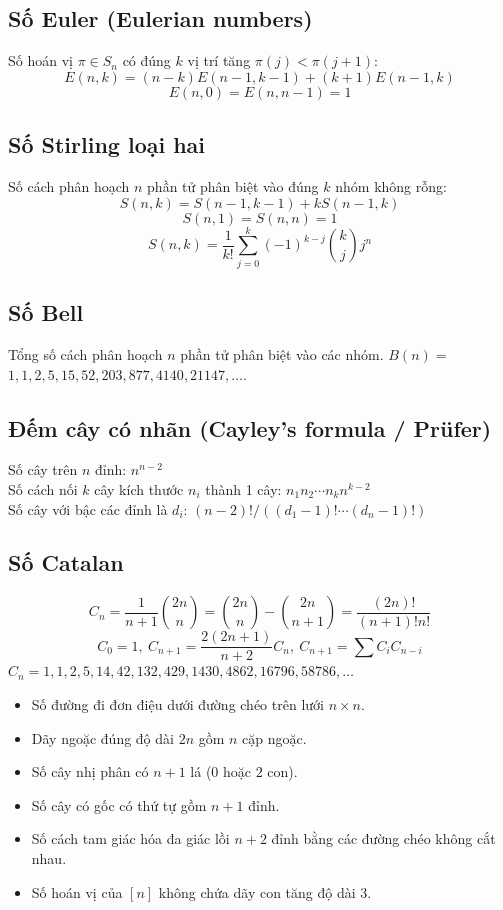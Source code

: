 	\subsection{Số Euler (Eulerian numbers)}
		Số hoán vị $\pi \in S_n$ có đúng $k$ vị trí tăng $\pi(j) < \pi(j+1)$:
		$$E(n,k) = (n-k)E(n-1,k-1) + (k+1)E(n-1,k)$$
		$$E(n,0) = E(n,n-1) = 1$$

	\subsection{Số Stirling loại hai}
		Số cách phân hoạch $n$ phần tử phân biệt vào đúng $k$ nhóm không rỗng:
		$$S(n,k) = S(n-1,k-1) + k S(n-1,k)$$
		$$S(n,1) = S(n,n) = 1$$
		$$S(n,k) = \frac{1}{k!}\sum_{j=0}^k (-1)^{k-j}\binom{k}{j}j^n$$

	\subsection{Số Bell}
		Tổng số cách phân hoạch $n$ phần tử phân biệt vào các nhóm. $B(n) =$
		$1, 1, 2, 5, 15, 52, 203, 877, 4140, 21147, \dots$.

	\subsection{Đếm cây có nhãn (Cayley's formula / Prüfer)}
		Số cây trên $n$ đỉnh: $n^{n-2}$ \\
		Số cách nối $k$ cây kích thước $n_i$ thành 1 cây: $n_1n_2\cdots n_k n^{k-2}$ \\
		Số cây với bậc các đỉnh là $d_i$: $(n-2)! / ((d_1-1)! \cdots (d_n-1)!)$

	\subsection{Số Catalan}
		\[ C_n=\frac{1}{n+1}\binom{2n}{n}= \binom{2n}{n}-\binom{2n}{n+1} = \frac{(2n)!}{(n+1)!n!} \]
		\[ C_0=1,\ C_{n+1} = \frac{2(2n+1)}{n+2}C_n,\ C_{n+1}=\sum C_iC_{n-i} \]
		${C_n = 1, 1, 2, 5, 14, 42, 132, 429, 1430, 4862, 16796, 58786, \dots}$
		\begin{itemize}[noitemsep]
			\item Số đường đi đơn điệu dưới đường chéo trên lưới $n\times n$.
			\item Dãy ngoặc đúng độ dài $2n$ gồm $n$ cặp ngoặc.
			\item Số cây nhị phân có $n+1$ lá ($0$ hoặc $2$ con).
			\item Số cây có gốc có thứ tự gồm $n+1$ đỉnh.
			\item Số cách tam giác hóa đa giác lồi $n+2$ đỉnh bằng các đường chéo không cắt nhau.
			\item Số hoán vị của $[n]$ không chứa dãy con tăng độ dài 3.
		\end{itemize}
